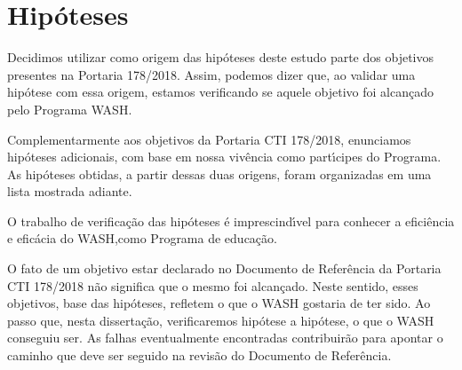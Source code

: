 \documentclass[
12pt,		%
openright,	%
twoside,  %
a4paper,			%
chapter=TITLE,		%
english,			%
french,				%
spanish,			%
brazil				%
]{USPSC-classe/USPSC}
\begin{document}
\section[Hip\'oteses]{Hip\'oteses}\label{Hip\'oteses}
Decidimos utilizar como origem das hip\'oteses deste estudo parte dos objetivos presentes na Portaria 178/2018. Assim, podemos dizer que, ao validar uma hip\'otese com essa origem, estamos verificando se aquele objetivo foi alcan\c{c}ado pelo Programa WASH.

















Complementarmente aos objetivos da Portaria CTI 178/2018, enunciamos hip\'oteses adicionais, com base em nossa viv\^encia como part\'{\i}cipes do Programa. As hip\'oteses obtidas, a partir dessas duas origens, foram organizadas em uma lista mostrada adiante.

















O trabalho de verifica\c{c}\~ao das hip\'oteses \'e imprescind\'{\i}vel para conhecer a efici\^encia e efic\'acia do WASH,como Programa de educa\c{c}\~ao.

















O fato de um objetivo estar declarado no Documento de Refer\^encia da Portaria CTI 178/2018 n\~ao significa que o mesmo foi alcan\c{c}ado. Neste sentido, esses objetivos, base das hip\'oteses, refletem \textquotedbl o que o WASH gostaria de ter sido\textquotedbl . Ao passo que, nesta disserta\c{c}\~ao, verificaremos hip\'otese a hip\'otese, \textquotedbl o que o WASH conseguiu ser\textquotedbl . As falhas eventualmente encontradas contribuir\~ao para apontar o caminho que deve ser seguido na revis\~ao do Documento de Refer\^encia.
\end{document}
